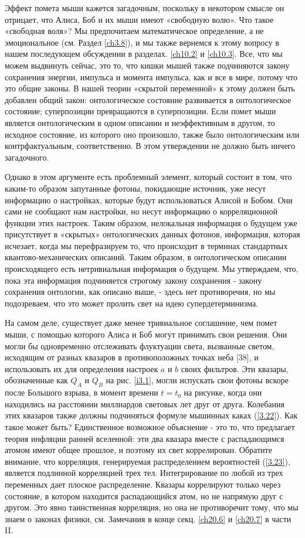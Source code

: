 \documentclass[main.tex]{subfiles}
\begin{document}
Эффект помета мыши кажется загадочным, поскольку в некотором смысле он отрицает, что Алиса, Боб и их мыши имеют «свободную волю». Что такое «свободная воля»? Мы предпочитаем математическое определение, а не эмоциональное (см. Раздел \ref{ch3.8}), и мы также вернемся к этому вопросу в нашем последующем обсуждении в разделах. \ref{ch10.2} и \ref{ch10.3}. Все, что мы можем выдвинуть сейчас, это то, что кишки мышей также подчиняются закону сохранения энергии, импульса и момента импульса, как и все в мире, потому что это общие законы. В нашей теории «скрытой переменной» к этому должен быть добавлен общий закон: онтологическое состояние развивается в онтологическое состояние; суперпозиции превращаются в суперпозиции. Если помет мыши является онтологическим в одном описании и неэффективным в другом, то исходное состояние, из которого оно произошло, также было онтологическим или контрфактуальным, соответственно. В этом утверждении не должно быть ничего загадочного.

Однако в этом аргументе есть проблемный элемент, который состоит в том, что каким-то образом запутанные фотоны, покидающие источник, уже несут информацию о настройках, которые будут использоваться Алисой и Бобом. Они сами не сообщают нам настройки, но несут информацию о корреляционной функции этих настроек. Таким образом, нелокальная информация о будущем уже присутствует в «скрытых» онтологических данных фотонов, информация, которая исчезает, когда мы перефразируем то, что происходит в терминах стандартных квантово-механических описаний. Таким образом, в онтологическом описании происходящего есть нетривиальная информация о будущем. Мы утверждаем, что, пока эта информация подчиняется строгому закону сохранения - закону сохранения онтологии, как описано выше, - здесь нет противоречия, но мы подозреваем, что это может пролить свет на идею супердетерминизма.

На самом деле, существует даже менее тривиальное соглашение, чем помет мыши, с помощью которого Алиса и Боб могут принимать свои решения. Они могли бы одновременно отслеживать флуктуации света, вызванные светом, исходящим от разных квазаров в противоположных точках неба [38], и использовать их для определения настроек $a$ и $b$ своих фильтров. Эти квазары, обозначенные как $Q_A$ и $Q_B$ на рис. \ref{i3.1}, могли испускать свои фотоны вскоре после Большого взрыва, в момент времени $t = t_0$ на рисунке, когда они находились на расстоянии миллиардов световых лет друг от друга. Колебания этих квазаров также должны подчиняться формуле мышинных каках (\ref{3.22}). Как такое может быть? Единственное возможное объяснение - это то, что предлагает теория инфляции ранней вселенной: эти два квазара вместе с распадающимся атомом имеют общее прошлое, и поэтому их свет коррелирован.
Обратите внимание, что корреляция, генерируемая распределением вероятностей (\ref{3.23}), является подлинной корреляцией трех тел. Интегрирование по любой из трех переменных дает плоское распределение. Квазары коррелируют только через состояние, в котором находится распадающийся атом, но не напрямую друг с другом. Это явно таинственная корреляция, но она не противоречит тому, что мы знаем о законах физики, см. Замечания в конце секц. \ref{ch20.6} и \ref{ch20.7} в части II.
\end{document}
